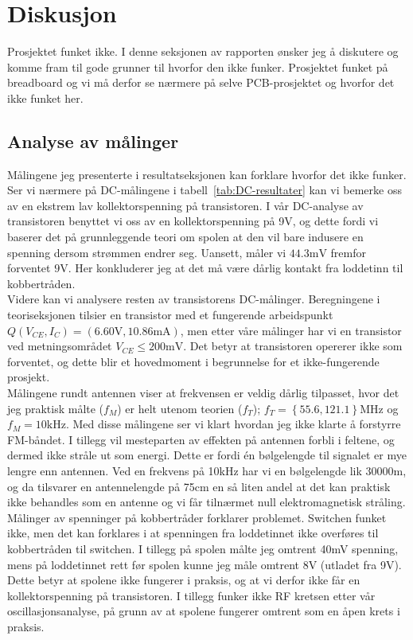 \section{Diskusjon}

Prosjektet funket ikke. I denne seksjonen av rapporten ønsker jeg å diskutere og komme fram til gode grunner til hvorfor den ikke funker. Prosjektet funket på breadboard og vi må derfor se nærmere på selve PCB-prosjektet og hvorfor det ikke funket her.

\subsection{Analyse av målinger}
Målingene jeg presenterte i resultatseksjonen kan forklare hvorfor det ikke funker. Ser vi nærmere på DC-målingene i tabell~\ref{tab:DC-resultater} kan vi bemerke oss av en ekstrem lav kollektorspenning på transistoren. I vår DC-analyse av transistoren benyttet vi oss av en kollektorspenning på 9V, og dette fordi vi baserer det på grunnleggende teori om spolen at den vil bare indusere en spenning dersom strømmen endrer seg. Uansett, måler vi $44.3\text{mV}$ fremfor forventet $9\text{V}$. Her konkluderer jeg at det må være dårlig kontakt fra loddetinn til kobbertråden.
\\[1em]
Videre kan vi analysere resten av transistorens DC-målinger. Beregningene i teoriseksjonen tilsier en transistor med et fungerende arbeidspunkt $Q(V_{CE}, I_C) = (6.60\text{V}, 10.86\text{mA})$, men etter våre målinger har vi en transistor ved metningsområdet $V_{CE} \le 200\text{mV}$. Det betyr at transistoren opererer ikke som forventet, og dette blir et hovedmoment i begrunnelse for et ikke-fungerende prosjekt.
\\[1em]
Målingene rundt antennen viser at frekvensen er veldig dårlig tilpasset, hvor det jeg praktisk målte ($f_M$) er helt utenom teorien ($f_T$); $f_{T} = \left\{55.6, 121.1\right\} \text{MHz}$ og $f_{M} = 10\text{kHz}$. Med disse målingene ser vi klart hvordan jeg ikke klarte å forstyrre FM-båndet. I tillegg vil mesteparten av effekten på antennen forbli i feltene, og dermed ikke stråle ut som energi. Dette er fordi én bølgelengde til signalet er mye lengre enn antennen. Ved en frekvens på 10kHz har vi en bølgelengde lik 30000m, og da tilsvarer en antennelengde på 75cm en så liten andel at det kan praktisk ikke behandles som en antenne og vi får tilnærmet null elektromagnetisk stråling.
\\[1em]
Målinger av spenninger på kobbertråder forklarer problemet. Switchen funket ikke, men det kan forklares i at spenningen fra loddetinnet ikke overføres til kobbertråden til switchen. I tillegg på spolen målte jeg omtrent 40mV spenning, mens på loddetinnet rett før spolen kunne jeg måle omtrent 8V (utladet fra 9V). Dette betyr at spolene ikke fungerer i praksis, og at vi derfor ikke får en kollektorspenning på transistoren. I tillegg funker ikke RF kretsen etter vår oscillasjonsanalyse, på grunn av at spolene fungerer omtrent som en åpen krets i praksis.
